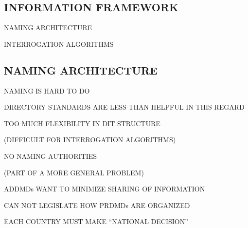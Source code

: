 \begin{bwslide}
\part	{INFORMATION FRAMEWORK}\bf

\begin{nrtc}
\item	NAMING ARCHITECTURE

\item	INTERROGATION ALGORITHMS
\end{nrtc}
\end{bwslide}


\begin{bwslide}
\part*	{NAMING ARCHITECTURE}\bf

\begin{nrtc}
\item	NAMING IS HARD TO DO

\item	DIRECTORY STANDARDS ARE LESS THAN HELPFUL IN THIS REGARD
\end{nrtc}
\end{bwslide}


\begin{bwslide}

\begin{nrtc}
\item	TOO MUCH FLEXIBILITY IN DIT STRUCTURE
    \begin{nrtc}
    \item	(DIFFICULT FOR INTERROGATION ALGORITHMS)
    \end{nrtc}

\item	NO NAMING AUTHORITIES
    \begin{nrtc}
    \item	(PART OF A MORE GENERAL PROBLEM)
    \end{nrtc}

\item	ADDMDs WANT TO MINIMIZE SHARING OF INFORMATION

\item	CAN NOT LEGISLATE HOW PRDMDs ARE ORGANIZED

\item	EACH COUNTRY MUST MAKE ``NATIONAL DECISION''
\end{nrtc}
\end{bwslide}


